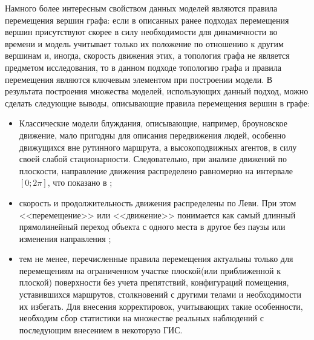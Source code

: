 Намного более интересным свойством данных моделей являются правила перемещения вершин графа: если в описанных ранее подходах перемещения вершин присутствуют скорее в силу необходимости для динамичности во времени и модель учитывает только их положение по отношению к другим вершинам и, иногда, скорость движения этих, а топология графа не является предметом исследования, то в данном подходе топологию графа и правила перемещения являются ключевым  элементом  при построении модели. В результата построения множества моделей, использующих данный подход, можно сделать следующие выводы, описывающие правила перемещения вершин в графе:
\begin{itemize}
	\item Классические модели блуждания, описывающие, например,  броуновское движение, мало пригодны для описания передвижения людей, особенно движущихся вне рутинного маршрута, а высокоподвижных агентов, в силу своей слабой стационарности. Следовательно, при анализе  движений по плоскости, направление движения распределено равномерно на интервале $[0; 2\pi]$, что показано в \cite{Rhee:2007} %
	;
	\item скорость и продолжительность движения распределены по Леви. При этом <<перемещение>> или <<движение>> понимается как  самый длинный прямолинейный  переход объекта с одного места в другое без паузы или изменения направления %
	\cite{Privalov:2015};	
	\item тем не менее, перечисленные правила перемещения актуальны только для перемещениям на ограниченном участке плоской(или приближенной к плоской)  поверхности без учета препятствий, конфигураций помещения, уставившихся маршрутов, столкновений с другими телами и необходимости их избегать. Для внесения корректировок, учитывающих такие особенности, необходим сбор статистики на множестве реальных наблюдений с последующим внесением в некоторую  ГИС. 
\end{itemize} 

